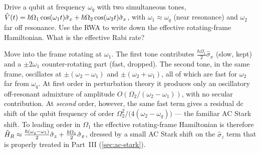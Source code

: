 \begin{exercise}
Drive a qubit at frequency $\omega_q$ with two simultaneous tones,
$\hat{V}(t)=\hbar\Omega_1\cos(\omega_1 t)\hat\sigma_x
+\hbar\Omega_2\cos(\omega_2 t)\hat\sigma_x$, with $\omega_1\approx\omega_q$
(near resonance) and $\omega_2$ far off resonance. Use the RWA to
write down the effective rotating-frame Hamiltonian. What is the
effective Rabi rate?
\begin{solution}
Move into the frame rotating at $\omega_1$. The first tone
contributes $\tfrac{\hbar\Omega_1}{2}\hat\sigma_x$ (slow, kept) and a
$\pm 2\omega_1$ counter-rotating part (fast, dropped). The second
tone, in the same frame, oscillates at
$\pm(\omega_2-\omega_1)$ and $\pm(\omega_2+\omega_1)$, all of which
are fast for $\omega_2$ far from $\omega_q$. At first order in
perturbation theory it produces only an oscillatory off-resonant
admixture of amplitude $O(\Omega_2/(\omega_2-\omega_1))$, with no
secular contribution. At \emph{second} order, however, the same
fast term gives a residual dc shift of the qubit frequency of
order $\Omega_2^2/\bigl(4(\omega_2-\omega_q)\bigr)$ --- the
familiar AC Stark shift. To leading order in $\Omega_1$ the
effective rotating-frame Hamiltonian is therefore
$\hat{H}_R\approx\tfrac{\hbar(\omega_q-\omega_1)}{2}\hat\sigma_z
+\tfrac{\hbar\Omega_1}{2}\hat\sigma_x$, dressed by a small AC
Stark shift on the $\hat\sigma_z$ term that is properly treated
in Part~III (\cref{sec:ac-stark}).
\end{solution}
\end{exercise}
